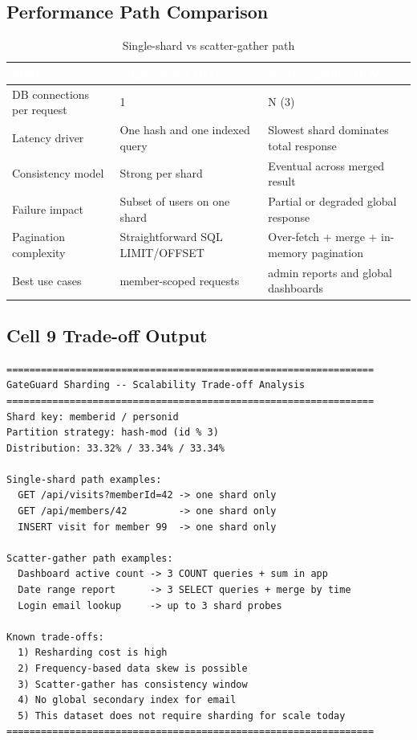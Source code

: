 \documentclass[a4paper,12pt]{article}
\newcommand{\tablehead}[1]{\textcolor{white}{\textbf{#1}}}
\begin{document}
\subsection{Performance Path Comparison}

\begin{table}[H]
\centering
\caption{Single-shard vs scatter-gather path}
\begin{tcolorbox}[tableframe,width=\textwidth,box align=center]
\begin{tabularx}{\textwidth}{L{4.1cm} Y Y}
\toprule
{}
\tablehead{Metric} & \tablehead{Single-shard O(1)} & \tablehead{Scatter-gather O(N)} \\
\midrule
DB connections per request & 1 & N (3) \\
Latency driver & One hash and one indexed query & Slowest shard dominates total response \\
Consistency model & Strong per shard & Eventual across merged result \\
Failure impact & Subset of users on one shard & Partial or degraded global response \\
Pagination complexity & Straightforward SQL LIMIT/OFFSET & Over-fetch + merge + in-memory pagination \\
Best use cases & member-scoped requests & admin reports and global dashboards \\
\bottomrule
\end{tabularx}
\end{tcolorbox}
\end{table}

\subsection{Cell 9 Trade-off Output}

\begin{lstlisting}[style=textoutput,caption={Cell 9 trade-off summary output}]
================================================================
GateGuard Sharding -- Scalability Trade-off Analysis
================================================================
Shard key: memberid / personid
Partition strategy: hash-mod (id % 3)
Distribution: 33.32% / 33.34% / 33.34%

Single-shard path examples:
  GET /api/visits?memberId=42 -> one shard only
  GET /api/members/42         -> one shard only
  INSERT visit for member 99  -> one shard only

Scatter-gather path examples:
  Dashboard active count -> 3 COUNT queries + sum in app
  Date range report      -> 3 SELECT queries + merge by time
  Login email lookup     -> up to 3 shard probes

Known trade-offs:
  1) Resharding cost is high
  2) Frequency-based data skew is possible
  3) Scatter-gather has consistency window
  4) No global secondary index for email
  5) This dataset does not require sharding for scale today
================================================================
\end{lstlisting}
\end{document}

